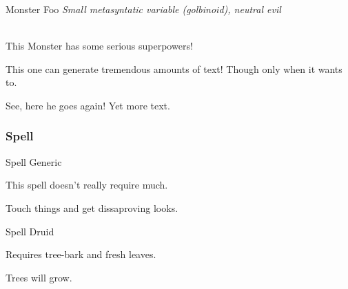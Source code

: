 \documentclass[10pt,twoside,twocolumn]{article}
\begin{document}
\begin{monsterbox}{Monster Foo}
    \textit{Small metasyntatic variable (golbinoid), neutral evil}\\
    \hline
    \basics[%
    armorclass = 12,
    hitpoints  = 16 (3d8 + 3),
    speed      = 50 ft
    ]
    \hline
    \stats[
    STR = 12 (+1),
    DEX = 14 (+2)
    ]
    \hline
    \details[%
    languages = {Common Lisp, Erlang},
    ]
    \hline \\[1mm]
    \begin{monsteraction}
        This Monster has some serious superpowers!
    \end{monsteraction}
    \begin{monsteraction}
        This one can generate tremendous amounts of text! Though only when it wants to.
    \end{monsteraction}

    \begin{monsteraction}
    See, here he goes again! Yet more text.
    \end{monsteraction}
\end{monsterbox}

\subsubsection{Spell}

\begin{spellbox}{Spell Generic}
    \spelldetails[]
    \begin{spellaction}[Materials]
    This spell doesn't really require much.
    \end{spellaction}

    \begin{spellaction}[Effect]
    Touch things and get dissaproving looks.
    \end{spellaction}
\end{spellbox}

\begin{spellbox}{Spell Druid}
    \spelldetails[%
    level   = 9,
    school  = Transmutation,
    time    = 1 action,
    range   = Touch,
    duration = Instant,
    components = {S,M},
    restrict = Druid,
    ritual = yes
    ]
    \begin{spellaction}[Materials]
    Requires tree-bark and fresh leaves.
    \end{spellaction}

    \begin{spellaction}[Effect]
    Trees will grow.
    \end{spellaction}
\end{spellbox}
\end{document}
